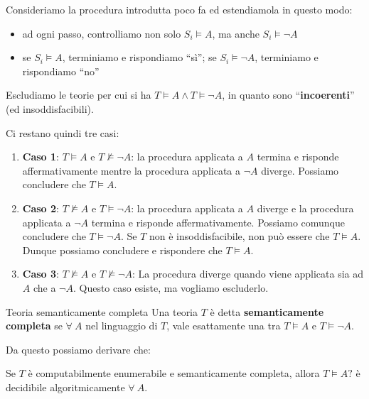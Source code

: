 \documentclass[a4paper,11pt]{report}
\begin{document}
Consideriamo la procedura introdutta poco fa ed estendiamola in questo modo: 
\begin{itemize}
    \item ad ogni passo, controlliamo non solo \( S_i \vDash A \), ma anche \( S_i \vDash \neg A \)
    \item se \( S_i \vDash A \), terminiamo e rispondiamo ``sì''; se \( S_i \vDash \neg A \), terminiamo e rispondiamo ``no''
\end{itemize}

Escludiamo le teorie per cui si ha \( T\vDash A \land T \vDash \neg A \), in quanto sono ``\textbf{incoerenti}'' (ed insoddisfacibili).

Ci restano quindi tre casi:
\vspace{-0.5em}
\begin{enumerate}
    \item \textbf{Caso 1}: \(T \models A\) e \(T \not\models \neg A\): la procedura applicata a \(A\) termina e risponde affermativamente mentre la procedura applicata a \(\neg A\) diverge. Possiamo concludere che \(T \models A\).

    \item \textbf{Caso 2}: \(T \not\models A\) e \(T \models \neg A\): la procedura applicata a \(A\) diverge e la procedura applicata a \(\neg A\) termina e risponde affermativamente. Possiamo comunque concludere che \(T \models \neg A\). Se \(T\) non è insoddisfacibile, non può essere che \(T \models A\). Dunque possiamo concludere e rispondere che \(T \models A\).

    \item \textbf{Caso 3}: \(T \not\models A\) e \(T \not\models \neg A\): La procedura diverge quando viene applicata sia ad \(A\) che a \(\neg A\). Questo caso esiste, ma vogliamo escluderlo.
\end{enumerate}

\begin{defframe}{Teoria semanticamente completa}{}
    Una teoria \( T \) è detta \textbf{semanticamente completa} se \( \forall \ A \) nel linguaggio di \( T \), vale esattamente una tra \( T \vDash A \) e \( T \vDash \neg A \).
\end{defframe}

Da questo possiamo derivare che:
\begin{thmframe}{}{}
    Se \( T \) è computabilmente enumerabile e semanticamente completa, allora \( T \vDash A ?\) è decidibile algoritmicamente \( \forall \ A \).
\end{thmframe}
\end{document}
